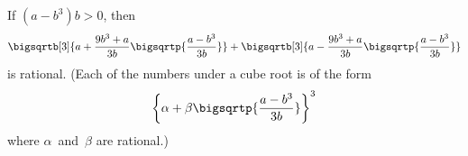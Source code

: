If $(a - b^{3})b > 0$, then
\[
\bigsqrtb[3]{a + \frac{9b^{3} + a}{3b}\bigsqrtp{\frac{a - b^{3}}{3b}}} +
\bigsqrtb[3]{a - \frac{9b^{3} + a}{3b}\bigsqrtp{\frac{a - b^{3}}{3b}}}
\]
is rational. (Each of the numbers under a cube root is of the form
\[
\left\{\alpha + \beta\bigsqrtp{\frac{a - b^{3}}{3b}}\right\}^{3}
\]
where $\alpha$~and~$\beta$ are rational.)

